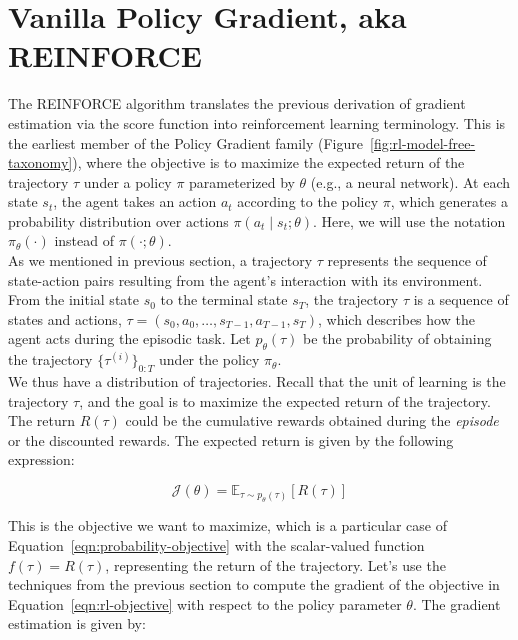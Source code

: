 \section{Vanilla Policy Gradient, aka REINFORCE}

The REINFORCE algorithm \citep{williams1992simple} translates the previous 
derivation of gradient estimation via the score function into reinforcement learning terminology. This is the earliest member of the Policy Gradient family (Figure~\ref{fig:rl-model-free-taxonomy}), where the objective is to maximize the expected return of the trajectory $\tau$ under a policy $\pi$ parameterized by $\theta$ (e.g., a neural network). At each state $s_{t}$, the agent takes an action $a_{t}$ according to the policy $\pi$, which generates a probability distribution over actions $\pi(a_{t}\mid s_{t};\theta)$. Here, we will use the notation $\pi_{\theta}(\cdot)$ instead of $\pi(\cdot;\theta)$. \\

\noindent As we mentioned in previous section, a trajectory $\tau$ represents the sequence of state-action pairs resulting from the agent's interaction with its environment. From the initial state $s_{0}$ to the terminal state $s_{T}$, the trajectory $\tau$ is a sequence of states and actions, $\tau = (s_{0}, a_{0}, \dots, s_{T-1}, a_{T-1}, s_{T})$, which describes how the agent
acts during the episodic task. Let $p_{\theta}(\tau)$ be the
probability of obtaining the trajectory $\{\tau^{(i)}\}_{0:T}$ under the policy $\pi_{\theta}$. \\

\noindent We thus have a distribution of trajectories. Recall that the unit of learning is the trajectory $\tau$, and the goal is to maximize the expected return of the trajectory. The return $R(\tau)$ could be the cumulative rewards obtained during the \textit{episode} or the discounted rewards. The expected return is given by the following expression:

\begin{equation}\label{eqn:rl-objective}
    \mathcal{J}(\theta)=\mathbb{E}_{\tau\sim p_{\theta}(\tau)}[R(\tau)] 
\end{equation}

\noindent This is the objective we want to maximize, which is a 
particular case of Equation~\ref{eqn:probability-objective} with the
scalar-valued function $f(\tau) = R(\tau)$, representing the return of the trajectory. Let's use the techniques from the previous section to compute the
gradient of the objective in Equation~\ref{eqn:rl-objective} with respect to the policy parameter $\theta$. The gradient estimation is given by:

